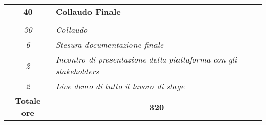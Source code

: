\begin{tabularx}{\textwidth}{|c|X|}
    \textbf{40} & \textbf{Collaudo Finale}  \\ \hdashline
 
    \multirow{4}{0cm}\\ 
    \textit{30} & 
    \textit{Collaudo} \\
    \textit{6} & 
    \textit{Stesura documentazione finale} \\
    \textit{2} & 
    \textit{Incontro di presentazione della piattaforma con gli stakeholders} \\
    \textit{2} & 
    \textit{Live demo di tutto il lavoro di stage} \\
    \hline
	
	\textbf{Totale ore} & \multicolumn{1}{|c|}{\textbf{320}} \\\hline
	
	
\end{tabularx}